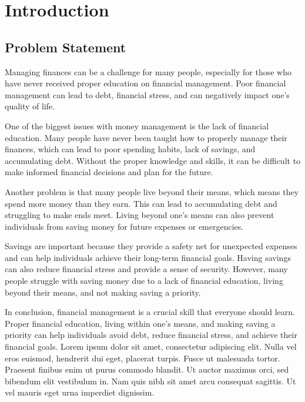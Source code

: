 
\chapter{Introduction}\label{cap:intro}

\section{Problem Statement}\label{sect:description}
\hspace{\parindent}

Managing finances can be a challenge for many people, especially for those who have never received proper education on financial management. Poor financial management can lead to debt, financial stress, and can negatively impact one's quality of life.

One of the biggest issues with money management is the lack of financial education. Many people have never been taught how to properly manage their finances, which can lead to poor spending habits, lack of savings, and accumulating debt. Without the proper knowledge and skills, it can be difficult to make informed financial decisions and plan for the future.

Another problem is that many people live beyond their means, which means they spend more money than they earn. This can lead to accumulating debt and struggling to make ends meet. Living beyond one's means can also prevent individuals from saving money for future expenses or emergencies.

Savings are important because they provide a safety net for unexpected expenses and can help individuals achieve their long-term financial goals. Having savings can also reduce financial stress and provide a sense of security. However, many people struggle with saving money due to a lack of financial education, living beyond their means, and not making saving a priority.

In conclusion, financial management is a crucial skill that everyone should learn. Proper financial education, living within one's means, and making saving a priority can help individuals avoid debt, reduce financial stress, and achieve their financial goals.
\vspace*{2mm}
\hspace{\parindent} Lorem ipsum dolor sit amet, consectetur adipiscing elit. Nulla vel eros euismod, hendrerit dui eget, placerat turpis. Fusce ut malesuada tortor. Praesent finibus enim ut purus commodo blandit. Ut auctor maximus orci, sed bibendum elit vestibulum in. Nam quis nibh sit amet arcu consequat sagittis. Ut vel mauris eget urna imperdiet dignissim.

